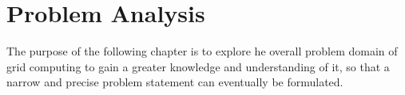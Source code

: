 \chapter{Problem Analysis}\label{ch:problem_analysis}

The purpose of the following chapter is to explore he overall problem domain of grid computing to gain a greater knowledge and understanding of it, so that a narrow and precise problem statement can eventually be formulated.
